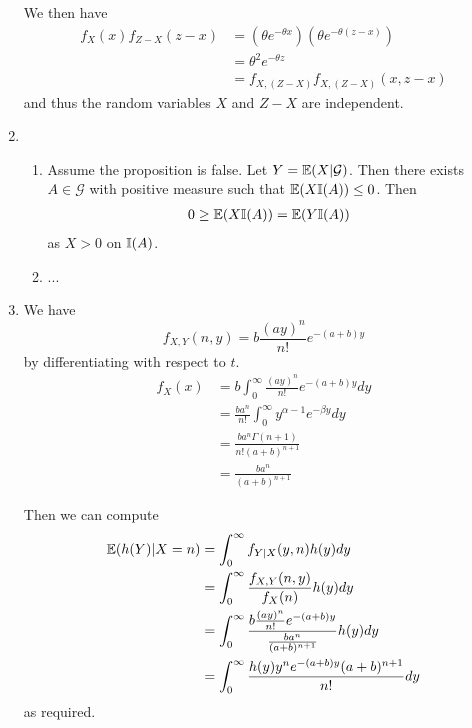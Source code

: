 \begin{enumerate}
  We then have
  \begin{align}
    \label{eq:9}
    f_{X}(x) f_{Z-X}(z-x) &= \left(\theta e^{-\theta x} \right)
    \left(\theta e^{-\theta (z -x)} \right) \\
    &= \theta^{2} e^{-\theta z} \\
    &= f_{X, (Z-X)} f_{X, (Z-X)}(x, z-x)
  \end{align} and thus the random variables $X$ and $Z-X$ are
  independent.

\item
  \begin{enumerate}
  \item Assume the proposition is false. Let $Y = \E{X |
      \mathcal{G}}$. Then there exists $A \in \mathcal{G}$ with
    positive measure such that $\E{X \I{A}} \leq 0$. Then
    \begin{align}
      \label{eq:8}
      0 \geq \E{X \I{A}} &= \E{Y \I{A}}
    \end{align} as $X > 0$ on $\I{A}$.
  \item ...
  \end{enumerate}


\item We have
  \begin{equation}
    \label{eq:12}
    f_{X, Y}(n, y) = b \frac{(ay)^{n}}{n!} e^{-(a+b)y}
  \end{equation} by differentiating with respect to $t$.
  \begin{align}
    \label{eq:10}
    f_{X}(x) &= b \int_{0}^{\infty} \frac{(ay)^{n}}{n!} e^{-(a+b)y} dy
    \\
    &= \frac{ba^{n}}{n!} \int_{0}^{\infty} y^{\alpha - 1} e^{-\beta y}
    dy \\
    &= \frac{ba^{n} \Gamma(n+1)}{n! (a+b)^{n+1}} \\
    &= \frac{ba^{n}}{(a+b)^{n+1}}
  \end{align}

  Then we can compute
  \begin{align}
    \label{eq:11}
    \E{h(Y) | X = n} &= \int_{0}^{\infty} f_{Y|X}(y, n) h(y) dy \\
    &= \int_{0}^{\infty} \frac{f_{X, Y}(n, y)}{f_{X}(n)} h(y) dy \\
    &= \int_{0}^{\infty} \frac{b \frac{(ay)^{n}}{n!} e^{-(a+b)
        y}}{\frac{ba^{n}}{(a+b)^{n+1}}} h(y) dy \\
    &= \int_{0}^{\infty} \frac{h(y) y^{n} e^{-(a+b)y}(a+b)^{n+1}}{n!}
    dy
  \end{align}
  as required.


\end{enumerate}
